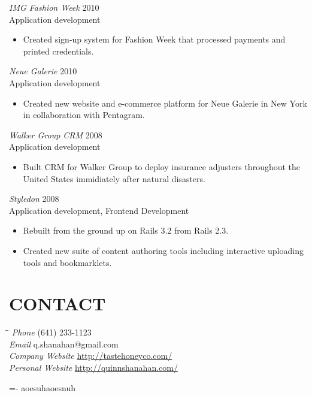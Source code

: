 \documentclass[line,margin]{res}
\begin{document}
\begin{resume}
    {\sl IMG Fashion Week}
    \hfill 2010 \\
    Application development
    \begin{itemize} \itemsep -2pt
        \item
            Created sign-up system for Fashion Week that processed payments
            and printed credentials.
    \end{itemize}

    {\sl Neue Galerie}
    \hfill 2010 \\
    Application development
    \begin{itemize} \itemsep -2pt
        \item
            Created new website and e-commerce platform for Neue Galerie in New York
            in collaboration with Pentagram.
    \end{itemize}

    \begin{samepage}
    {\sl Walker Group CRM}
    \hfill 2008 \\
    Application development
    \begin{itemize} \itemsep -2pt
        \item
            Built CRM for Walker Group to deploy insurance adjusters throughout the United
            States immidiately after natural disasters.
    \end{itemize}
    \end{samepage}

    {\sl Styledon}
    \hfill 2008 \\
    Application development, Frontend Development
    \begin{itemize} \itemsep -2pt
        \item
            Rebuilt from the ground up on Rails 3.2 from Rails 2.3.
        \item
            Created new suite of content authoring tools including interactive uploading tools
            and bookmarklets.
    \end{itemize}

\section{CONTACT}
    \vspace{-2.3ex}
    \begin{tabbing}
    \hspace{1.5in}\= \hspace{2.0in}\= \kill
    {\sl Phone}
        \> (641) 233-1123 \\
    {\sl Email}
        \> q.shanahan@gmail.com \\
    {\sl Company Website}
        \> \url{http://tastehoneyco.com/} \\
    {\sl Personal Website}
        \> \url{http://quinnshanahan.com/} \\
    \end{tabbing}

\vfill
\leftskip=-\hoffset
\linename
aoesuhaoesnuh

\end{resume}
\end{document}
